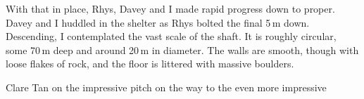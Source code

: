 With that in place, Rhys, Davey and I made rapid progress down to  proper. Davey and I huddled in the shelter as Rhys bolted the final 5\,m down. Descending, I contemplated the vast scale of the shaft. It is roughly circular, some 70\,m deep and around 20\,m in diameter. The walls are smooth, though with loose flakes of rock, and the floor is littered with massive boulders.

\begin{marginfigure}
\label{Ta Mokra}
\caption{Clare Tan on the impressive pitch on the way to the even more impressive \protect{}}
\end{marginfigure}



